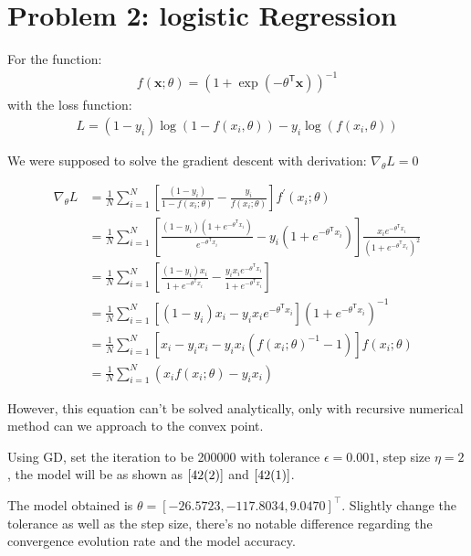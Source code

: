 \documentclass[a4paper,12pt]{article}
\begin{document}
\section{Problem 2: logistic Regression}

For the function: 
\begin{align}
f(\textbf{x};\theta) = (1+\exp(-\theta^{\mathsf{T}}\textbf{x}))^{-1} \nonumber
\end{align}
with the loss function:
\begin{align}
L = (1-y_i)\log(1-f(x_i, \theta)) - y_i \log(f(x_i, \theta)) \nonumber
\end{align}

We were supposed to solve the gradient descent with derivation: $\nabla_{\theta}L = 0$

\begin{align}
\nabla_{\theta}L &= \frac{1}{N} \sum^{N}_{i=1} \left[\frac{(1-y_i)}{1-f(x_i; \theta)} - \frac{y_i}{f(x_i; \theta)} \right] f^{'}(x_i;\theta) \nonumber\\
& = \frac{1}{N} \sum^{N}_{i=1} \left[ \frac{(1-y_i)(1+e^{-\theta^{\mathsf{T}}x_i})}{e^{-\theta^{\mathsf{T}}x_i}}  - y_i(1+e^{-\theta^{\mathsf{T}}x_i}) \right] \frac{x_i e^{-\theta^{\mathsf{T}}x_i}}{(1+e^{-\theta^{\mathsf{T}}x_i})^2} \nonumber\\
& = \frac{1}{N} \sum^{N}_{i=1} \left[ \frac{(1-y_i)x_i}{1+e^{-\theta^{\mathsf{T}}x_i}} - \frac{y_i x_i e^{-\theta^{\mathsf{T}}x_i}}{1+e^{-\theta^{\mathsf{T}}x_i}}  \right] \nonumber \\
& = \frac{1}{N} \sum^{N}_{i=1} \left[  (1-y_i)x_i - y_i x_i e^{-\theta^{\mathsf{T}}x_i}\right] (1+e^{-\theta^{\mathsf{T}}x_i})^{-1}   \nonumber \\
& = \frac{1}{N} \sum^{N}_{i = 1} \left[   x_i -y_i x_i - y_i x_i (f(x_i; \theta)^{-1} - 1)\right]f(x_i; \theta)  \nonumber \\
& = \frac{1}{N} \sum^{N}_{i = 1} (  x_i f(x_i; \theta)- y_i x_i ) \nonumber 
\end{align}

However, this equation can't be solved analytically, only with recursive numerical method can we approach to the convex point. 

Using  GD, set the iteration to be 200000 with tolerance $\epsilon = 0.001$, step size $ \eta = 2 $,  the model will be as shown as $\ref{42(2)}$ and $\ref{42(1)}$.

The model obtained is $\theta = [ -26.5723, -117.8034, 9.0470]^{\top}$. Slightly change the tolerance as well as the step size, there's no notable difference regarding the convergence evolution rate and the model accuracy.
\end{document}
